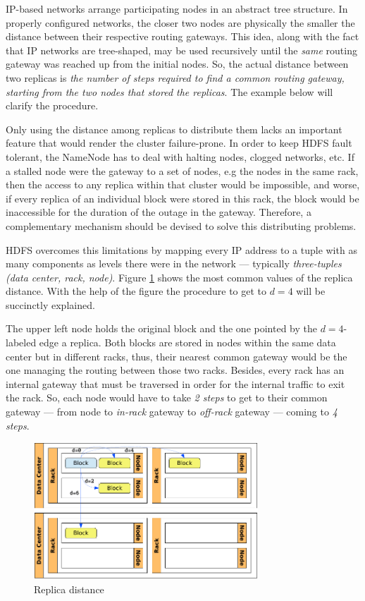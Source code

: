 IP-based networks arrange participating nodes in an abstract tree structure. In properly configured networks, the closer two nodes are physically the smaller the distance between their respective routing gateways. This idea, along with the fact that IP networks are tree-shaped, may be used recursively until the \emph{same} routing gateway was reached up from the initial nodes. So, the actual distance between two replicas is \emph{the number of steps required to find a common routing gateway, starting from the two nodes that stored the replicas}. The example below will clarify the procedure.

Only using the distance among replicas to distribute them lacks an important feature that would render the cluster failure-prone. In order to keep HDFS fault tolerant, the NameNode has to deal with halting nodes, clogged networks, etc. If a stalled node were the gateway to a set of nodes, e.g the nodes in the same rack, then the access to any replica within that cluster would be impossible, and worse, if every replica of an individual block were stored in this rack, the block would be inaccessible for the duration of the outage in the gateway. Therefore, a complementary mechanism should be devised to solve this distributing problems.

HDFS overcomes this limitations by mapping every IP address to a tuple with as many components as levels there were in the network --- typically \emph{three-tuples} \emph{(data center, rack, node)}. Figure \ref{fig:distnodos} shows the most common values of the replica distance. With the help of the figure the procedure to get to $d=4$ will be succinctly explained.

The upper left node holds the original block and the one pointed by the $d=4$-labeled edge a replica. Both blocks are stored in nodes within the same data center but in different racks, thus, their nearest common gateway would be the one managing the routing between those two racks. Besides, every rack has an internal gateway that must be traversed in order for the internal traffic to exit the rack. So, each node would have to take \emph{2 steps} to get to their common gateway --- from node to \emph{in-rack} gateway to \emph{off-rack} gateway --- coming to \emph{4 steps}.

\begin{figure}[tbp]
\begin{center}
\includegraphics[width=0.75\textwidth]{imagenes/018.pdf}
 \caption{Replica distance}
\label{fig:distnodos}
\end{center}
\end{figure}

